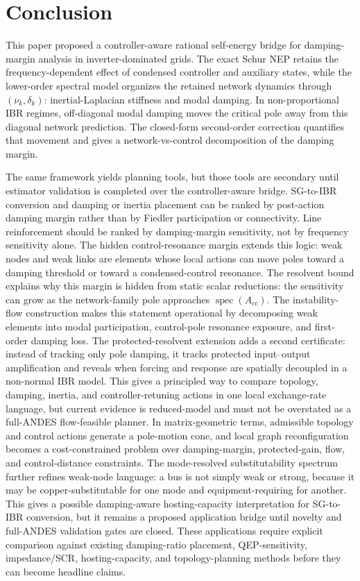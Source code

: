\documentclass[journal]{IEEEtran}
\begin{document}
\section{Conclusion}

This paper proposed a controller-aware rational self-energy bridge for damping-margin analysis in inverter-dominated grids. The exact Schur NEP retains the frequency-dependent effect of condensed controller and auxiliary states, while the lower-order spectral model organizes the retained network dynamics through $(\nu_k,\delta_k)$: inertial-Laplacian stiffness and modal damping. In non-proportional IBR regimes, off-diagonal modal damping moves the critical pole away from this diagonal network prediction. The closed-form second-order correction quantifies that movement and gives a network-vs-control decomposition of the damping margin.

The same framework yields planning tools, but those tools are secondary until estimator validation is completed over the controller-aware bridge. SG-to-IBR conversion and damping or inertia placement can be ranked by post-action damping margin rather than by Fiedler participation or connectivity. Line reinforcement should be ranked by damping-margin sensitivity, not by frequency sensitivity alone. The hidden control-resonance margin extends this logic: weak nodes and weak links are elements whose local actions can move poles toward a damping threshold or toward a condensed-control resonance. The resolvent bound explains why this margin is hidden from static scalar reductions: the sensitivity can grow as the network-family pole approaches $\operatorname{spec}(A_{cc})$. The instability-flow construction makes this statement operational by decomposing weak elements into modal participation, control-pole resonance exposure, and first-order damping loss. The protected-resolvent extension adds a second certificate: instead of tracking only pole damping, it tracks protected input--output amplification and reveals when forcing and response are spatially decoupled in a non-normal IBR model. This gives a principled way to compare topology, damping, inertia, and controller-retuning actions in one local exchange-rate language, but current evidence is reduced-model and must not be overstated as a full-ANDES flow-feasible planner. In matrix-geometric terms, admissible topology and control actions generate a pole-motion cone, and local graph reconfiguration becomes a cost-constrained problem over damping-margin, protected-gain, flow, and control-distance constraints. The mode-resolved substitutability spectrum further refines weak-node language: a bus is not simply weak or strong, because it may be copper-substitutable for one mode and equipment-requiring for another. This gives a possible damping-aware hosting-capacity interpretation for SG-to-IBR conversion, but it remains a proposed application bridge until novelty and full-ANDES validation gates are closed. These applications require explicit comparison against existing damping-ratio placement, QEP-sensitivity, impedance/SCR, hosting-capacity, and topology-planning methods before they can become headline claims.
\end{document}

